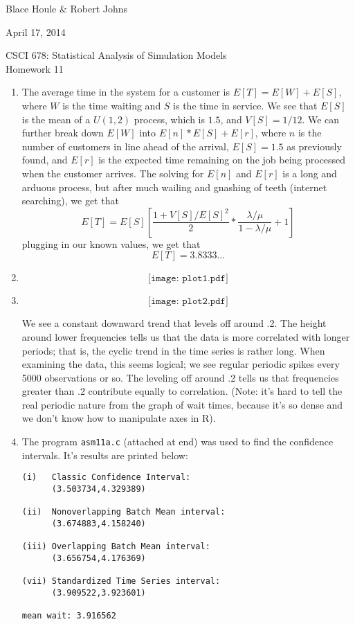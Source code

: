 \documentclass[11pt]{article} %
\begin{document}
\hfill Blace Houle \& Robert Johns

\hfill April 17, 2014

\begin{center} {\Large CSCI 678: Statistical Analysis of Simulation Models}\\{\large Homework 11}\end{center}

\begin{enumerate}

\item The average time in the system for a customer is $E[T] = E[W] + E[S]$, where $W$ is the time waiting and $S$ is the time in service.  We see that $E[S]$ is the mean of a $U(1,2)$ process, which is $1.5$, and $V[S] = 1/12$.  We can further break down $E[W]$ into $E[n] * E[S] + E[r]$, where $n$ is the number of customers in line ahead of the arrival, $E[S] = 1.5$ as previously found, and $E[r]$ is the expected time remaining on the job being processed when the customer arrives.  The solving for $E[n]$ and $E[r]$ is a long and arduous process, but after much wailing and gnashing of teeth (internet searching), we get that
$$E[T] = E[S]\left[\frac{1 + V[S]/E[S]^2}{2} * \frac{\lambda/\mu}{1 - \lambda/\mu} + 1\right]$$
plugging in our known values, we get that
$$E[T] = 3.8333...$$

\item $$\texttt{[image: plot1.pdf]}$$

\item $${\texttt{[image: plot2.pdf]}}$$

We see a constant downward trend that levels off around .2.  The height around lower frequencies tells us that the data is more correlated with longer periods; that is, the cyclic trend in the time series is rather long.  When examining the data, this seems logical; we see regular periodic spikes every 5000 observations or so.  The leveling off around .2 tells us that frequencies greater than .2 contribute equally to correlation. (Note: it's hard to tell the real periodic nature from the graph of wait times, because it's so dense and we don't know how to manipulate axes in R).

\item The program \texttt{asm11a.c} (attached at end) was used to find the confidence intervals.  It's results are printed below:

\begin{verbatim}(i)   Classic Confidence Interval:
      (3.503734,4.329389)

(ii)  Nonoverlapping Batch Mean interval:
      (3.674883,4.158240)

(iii) Overlapping Batch Mean interval:
      (3.656754,4.176369)

(vii) Standardized Time Series interval:
      (3.909522,3.923601)

mean wait: 3.916562\end{verbatim}

\end{enumerate}
\end{document}

